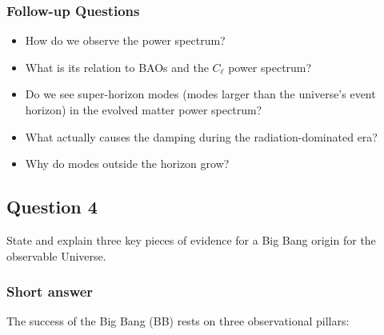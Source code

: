 \documentclass[a4paper,11pt]{article}
\begin{document}
\subsubsection{Follow-up Questions}

\begin{itemize}
    \item How do we observe the power spectrum?
    \item What is its relation to BAOs and the $C_\ell$ power spectrum?
    \item Do we see super-horizon modes (modes larger than the universe's event horizon) in the evolved matter power spectrum?
    \item What actually causes the damping during the radiation-dominated era?
    \item Why do modes outside the horizon grow?
\end{itemize}

%
%

\newpage
\subsection{Question 4}

State and explain three key pieces of evidence for a Big Bang origin for the observable Universe.

\subsubsection{Short answer}

The success of the Big Bang (BB) rests on three observational pillars:
\end{document}
